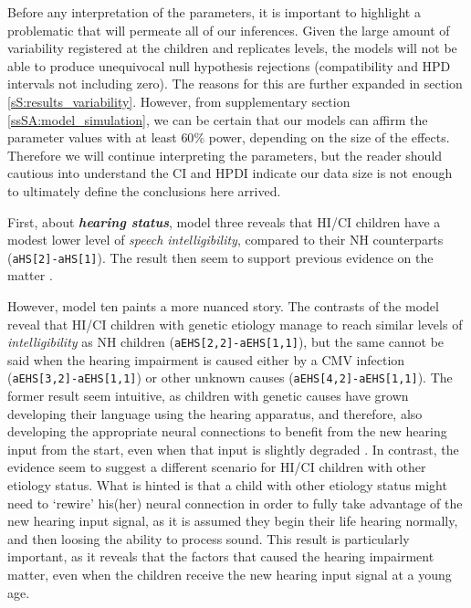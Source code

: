 Before any interpretation of the parameters, it is important to highlight a problematic that will permeate all of our inferences. Given the large amount of variability registered at the children and replicates levels, the models will not be able to produce unequivocal null hypothesis rejections (compatibility and HPD intervals not including zero). The reasons for this are further expanded in section \ref{sS:results_variability}. However, from supplementary section \ref{ssSA:model_simulation}, we can be certain that our models can affirm the parameter values with at least $60\%$ power, depending on the size of the effects. Therefore we will continue interpreting the parameters, but the reader should cautious into understand the CI and HPDI indicate our data size is not enough to ultimately define the conclusions here arrived.

First, about \textbf{\textit{hearing status}}, model three reveals that HI/CI children have a modest lower level of \textit{speech intelligibility}, compared to their NH counterparts (\texttt{aHS[2]-aHS[1]}). The result then seem to support previous evidence on the matter \cite{Nicholas_et_al_2007, Castellanos_et_al_2014, Chin_et_al_2014, Geers_et_al_2016, Freeman_et_al_2017, Duchesne_et_al_2019, Grandon_et_al_2020}. 

However, model ten paints a more nuanced story. The contrasts of the model reveal that HI/CI children with genetic etiology manage to reach similar levels of \textit{intelligibility} as NH children (\texttt{aEHS[2,2]-aEHS[1,1]}), but the same cannot be said when the hearing impairment is caused either by a CMV infection (\texttt{aEHS[3,2]-aEHS[1,1]}) or other unknown causes (\texttt{aEHS[4,2]-aEHS[1,1]}). The former result seem intuitive, as children with genetic causes have grown developing their language using the hearing apparatus, and therefore, also developing the appropriate neural connections to benefit from the new hearing input from the start, even when that input is slightly degraded \cite{Drennan_et_al_2008}. In contrast, the evidence seem to suggest a different scenario for HI/CI children with other etiology status. What is hinted is that a child with other etiology status might need to `rewire' his(her) neural connection in order to fully take advantage of the new hearing input signal, as it is assumed they begin their life hearing normally, and then loosing the ability to process sound. This result is particularly important, as it reveals that the factors that caused the hearing impairment matter, even when the children receive the new hearing input signal at a young age.

